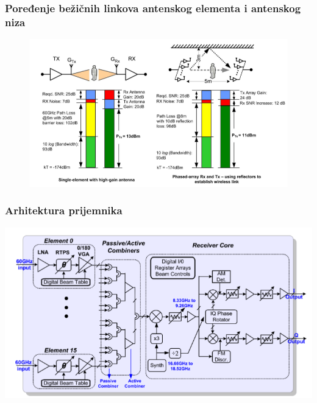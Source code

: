 \documentclass{beamer}
\begin{document}

\begin{frame}
\frametitle{Poređenje bežičnih linkova antenskog elementa i antenskog niza}
  \begin{figure}[!htbp]
    \centering
    \includegraphics[width=\linewidth]{link_single_element_vs_phased-array@60GHz.png}
    \label{fig:element_vs_array}
  \end{figure}
\end{frame}



\begin{frame}
  \frametitle{Arhitektura prijemnika}
  \includegraphics[width=\linewidth]{rx-arch-freq-plan.png}
\end{frame}
\end{document}
